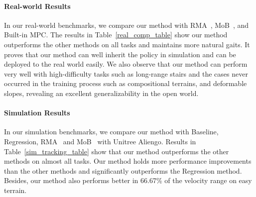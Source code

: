\paragraph{Real-world Results}
In our real-world benchmarks, we compare our method with RMA~\citep{kumar2021rma}, MoB~\citep{margolis2023walk}, and Built-in MPC. 
The results in Table~\ref{real_comp_table} show our method outperforms the other methods on all tasks and maintains more natural gaits.
It proves that our method can well inherit the policy in simulation and can be deployed to the real world easily.
We also observe that our method can perform very well with high-difficulty tasks such as long-range stairs and the cases never occurred in the training process such as compositional terrains, and deformable slopes, revealing an excellent generalizability in the open world. 


\paragraph{Simulation Results}
In our simulation benchmarks, we compare our method with Baseline, Regression, RMA~\citep{kumar2021rma} and MoB~\citep{margolis2023walk} with Unitree Aliengo.
Results in Table~\ref{sim_tracking_table} show that our method outperforms the other methods on almost all tasks. 
Our method holds more performance improvements than the other methods and significantly outperforms the Regression method. 
Besides, our method also performs better in 66.67\% of the velocity range on easy terrain.


